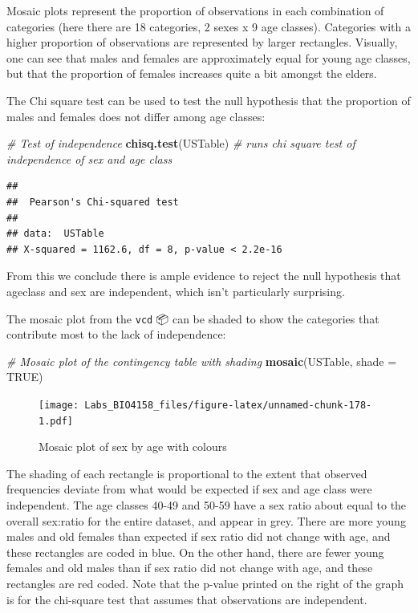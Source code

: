 \documentclass[
  12pt,
]{book}
\newenvironment{Shaded}{\begin{snugshade}}{\end{snugshade}}
\newcommand{\CommentTok}[1]{\textcolor[rgb]{0.56,0.35,0.01}{\textit{#1}}}
\newcommand{\DataTypeTok}[1]{\textcolor[rgb]{0.13,0.29,0.53}{#1}}
\newcommand{\KeywordTok}[1]{\textcolor[rgb]{0.13,0.29,0.53}{\textbf{#1}}}
\newcommand{\NormalTok}[1]{#1}
\newcommand{\OtherTok}[1]{\textcolor[rgb]{0.56,0.35,0.01}{#1}}
\begin{document}
Mosaic plots represent the proportion of observations in each combination of categories (here there are 18 categories, 2 sexes x 9 age classes). Categories with a higher proportion of observations are represented by larger rectangles. Visually, one can see that males and females are approximately equal for young age classes, but that the proportion of females increases quite a bit amongst the elders.

The Chi square test can be used to test the null hypothesis that the proportion of males and females does not differ among age classes:

\begin{Shaded}
\begin{Highlighting}[]
\CommentTok{\# Test of independence}
\KeywordTok{chisq.test}\NormalTok{(USTable) }\CommentTok{\# runs chi square test of independence of sex and age class}
\end{Highlighting}
\end{Shaded}

\begin{verbatim}
## 
##  Pearson's Chi-squared test
## 
## data:  USTable
## X-squared = 1162.6, df = 8, p-value < 2.2e-16
\end{verbatim}

From this we conclude there is ample evidence to reject the null hypothesis that ageclass and sex are independent, which isn't particularly surprising.

The mosaic plot from the \texttt{vcd} 📦 can be shaded to show the categories that contribute most to the lack of independence:

\begin{Shaded}
\begin{Highlighting}[]
\CommentTok{\# Mosaic plot of the contingency table with shading}
\KeywordTok{mosaic}\NormalTok{(USTable, }\DataTypeTok{shade =} \OtherTok{TRUE}\NormalTok{)}
\end{Highlighting}
\end{Shaded}

\begin{figure}
\centering
\texttt{[image: Labs\_BIO4158\_files/figure-latex/unnamed-chunk-178-1.pdf]}
\caption{\label{fig:unnamed-chunk-178}Mosaic plot of sex by age with colours}
\end{figure}

The shading of each rectangle is proportional to the extent that observed frequencies deviate from what would be expected if sex and age class were independent. The age classes 40-49 and 50-59 have a sex ratio about equal to the overall sex:ratio for the entire dataset, and appear in grey. There are more young males and old females than expected if sex ratio did not change with age, and these rectangles are coded in blue. On the other hand, there are fewer young females and old males than if sex ratio did not change with age, and these rectangles are red coded. Note that the p-value printed on the right of the graph is for the chi-square test that assumes that observations are independent.
\end{document}
